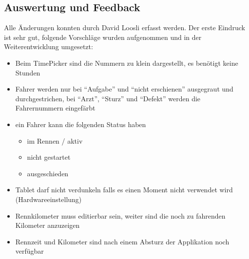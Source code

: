 \subsection{Auswertung und Feedback}
Alle Änderungen konnten durch David Loosli erfasst werden. Der erste Eindruck ist sehr gut, folgende Vorschläge wurden aufgenommen und in der Weiterentwicklung umgesetzt:
\begin{itemize}
\item Beim TimePicker sind die Nummern zu klein dargestellt, es benötigt keine Stunden
\item Fahrer werden nur bei "`Aufgabe"'  und "`nicht erschienen"' ausgegraut und durchgestrichen, bei "`Arzt"', "`Sturz"' und "`Defekt"' werden die Fahrernummern eingefärbt
\item ein Fahrer kann die folgenden Status haben
\begin{itemize}
\item im Rennen / aktiv
\item nicht gestartet
\item ausgeschieden
\end{itemize}
\item Tablet darf nicht verdunkeln falls es einen Moment nicht verwendet wird (Hardwareeinstellung)
\item Rennkilometer muss editierbar sein, weiter sind die noch zu fahrenden Kilometer anzuzeigen
\item Rennzeit und Kilometer sind nach einem Absturz der Applikation noch verfügbar
\end{itemize}
